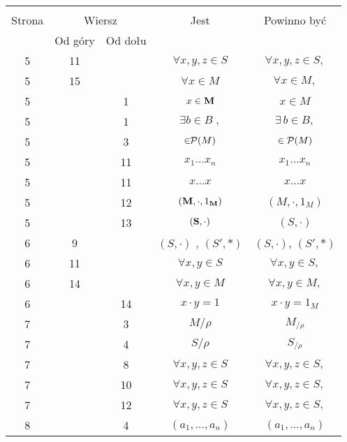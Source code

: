 \documentclass[a4paper,11pt]{article}
\begin{document}
\newpage



\begin{center}

  \begin{tabular}{|c|c|c|c|c|}
    \hline
    & \multicolumn{2}{c|}{} & & \\
    Strona & \multicolumn{2}{c|}{Wiersz} & Jest
                              & Powinno być \\ \cline{2-3}
    & Od góry & Od dołu & & \\
    \hline
    5  & 11 & & $\forall x, y, z \in S$ & $\forall x, y, z \in S,$ \\
    5  & 15 & & $\forall x \in M$ & $\forall x \in M,$ \\
    5  & &  1 & $x \in \textrm{\textbf{M}}$ & $x \in M$ \\
    5  & &  1 & $\exists b \in B\; ,$ & $\exists \, b \in B,$ \\
    5  & &  3 & $\in \!\! \mathcal{P}( M )$ & $\in \mathcal{P}( M )$ \\
    5  & & 11 & $x_{ 1 } ... x_{ n }$ & $x_{ 1 } \ldots x_{ n }$ \\
    5  & & 11 & $x ... x$ & $x \ldots x$ \\
    5  & & 12 & $( \textrm{\textbf{M}}, \cdot, 1_{ \textrm{\textbf{M}}} )$
           & $( M, \cdot, 1_{ M } )$ \\
    5  & & 13 & $( \textrm{\textbf{S}}, \cdot )$ & $( S, \cdot )$ \\
    6  &  9 & & $( S, \cdot )${ }, { }{ }$( S', \ast )$
           & $( S, \cdot )$, $( S', \ast )$ \\
    6  & 11 & & $\forall x, y \in S$ & $\forall x, y \in S,$ \\
    6  & 14 & & $\forall x, y \in M$ & $\forall x, y \in M,$ \\
    6  & & 14 & $x \cdot y = 1$ & $x \cdot y = 1_{ M }$ \\
    7  & &  3 & $M / \rho$ & $M_{ / \rho }$ \\
    7  & &  4 & $S / \rho$ & $S_{ / \rho }$ \\
    7  & &  8 & $\forall x, y, z \in S$ & $\forall x, y, z \in S,$ \\
    7  & & 10 & $\forall x, y, z \in S$ & $\forall x, y, z \in S,$ \\
    7  & & 12 & $\forall x, y, z \in S$ & $\forall x, y, z \in S,$ \\
    8  & &  4 & $( a_{ 1 }, ..., a_{ n } )$ & $( a_{ 1 }, \ldots, a_{ n } )$ \\

\end{tabular}
\end{center}
\end{document}
